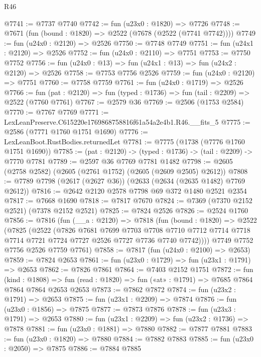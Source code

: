 \begin{lexlean}{R46}
\begin{coremodule}
@7741 := @7737 @7740
@7742 := fun (u23x0 : @1820) => @7726
@7748 := @7671 (fun (bound : @1820) => @2522 (@7678 (@2522 (@7741 @7742))))
@7749 := fun (u24x0 : @2120) => @2526
@7750 := @7748 @7749
@7751 := fun (u24x1 : @2120) => @2526
@7752 := fun (u24x0 : @2110) => @7751
@7753 := @7750 @7752
@7756 := fun (u24x0 : @13) => fun (u24x1 : @13) => fun (u24x2 : @2120) => @2526
@7758 := @7753 @7756 @2526
@7759 := fun (u24x0 : @2120) => @7751
@7760 := @7758 @7759
@7761 := fun (u24x0 : @1719) => @2526
@7766 := fun (pat : @2120) => fun (typed : @1736) => fun (tail : @2209) => @2522 (@7760 @7761)
@7767 := @2579 @36
@7769 := @2506 (@1753 @2584)
@7770 := @7767 @7769
@7771 := LexLeanPreserve.C615220e1769868758816f61a54a2e4b1.R46.__fits_5
@7775 := @2586 (@7771 @1760 @1751 @1690)
@7776 := LexLeanBoot.RustBodies.returnedLet
@7781 := @7775 (@1738 (@7776 @1760 @1751 @1690))
@7785 := (pat : @2120) -> (typed : @1736) -> (tail : @2209) -> @7770 @7781
@7789 := @2597 @36 @7769 @7781 @1482
@7798 := @2605 (@2758 @2582) (@2605 (@2761 @1752) (@2605 (@2609 @2505) @2612))
@7808 := @7789 @7798 (@2617 (@2627 @36)) (@2633 (@2634 (@2635 @1482) @7769 @2612))
@7816 := @2642 @2120 @2578 @7798 @69 @372 @1480 @2521 @2354
@7817 := @7668 @1690
@7818 := @7817 @7670
@7824 := @7369 (@7370 @2152 @2521) (@7378 @2152 @2521)
@7825 := @7824 @2526
@7826 := @2524 @1760
@7856 := @7816
    (fun (__a : @2120) =>
    @7818
      (fun (bound : @1820) =>
      @2522
        (@7825
          (@2522
            (@7826
              @7681
              @7699
              @7703
              @7708
              @7710
              @7712
              @7714
              @7718
              @7714
              @7721
              @7724
              @7727
              @2526
              @7727
              @7736
              @7740
              @7742))))
      @7749
      @7752
      @7756
      @2526
      @7759
      @7761)
@7858 := @7817 (fun (u24x0 : @2100) => @2653)
@7859 := @7824 @2653
@7861 := fun (u23x0 : @1729) => fun (u23x1 : @1791) => @2653
@7862 := @7826 @7861
@7864 := @7403 @2152 @1751
@7872 := fun (kind : @1808) =>
  fun (read : @1820) => fun («at» : @1791) => @7685 @7864 @7864 @7864 @2653 @2653
@7873 := @7862 @7872
@7874 := fun (u23x2 : @1791) => @2653
@7875 := fun (u23x1 : @2209) => @7874
@7876 := fun (u23x0 : @1856) => @7875
@7877 := @7873 @7876
@7878 := fun (u23x3 : @1791) => @2653
@7880 := fun (u23x1 : @2209) => fun (u23x2 : @1736) => @7878
@7881 := fun (u23x0 : @1881) => @7880
@7882 := @7877 @7881
@7883 := fun (u23x0 : @1820) => @7880
@7884 := @7882 @7883
@7885 := fun (u23x0 : @2050) => @7875
@7886 := @7884 @7885

\end{coremodule}
\end{lexlean}
